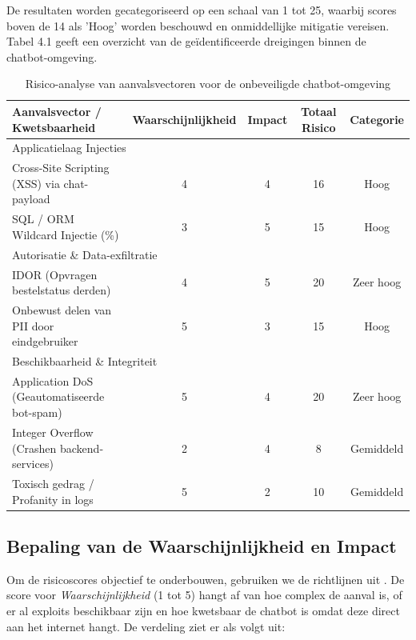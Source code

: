 De resultaten worden gecategoriseerd op een schaal van 1 tot 25, waarbij scores boven de 14 als 'Hoog' worden beschouwd en onmiddellijke mitigatie vereisen. Tabel 4.1 geeft een overzicht van de geïdentificeerde dreigingen binnen de chatbot-omgeving.

\begin{table}[H]
    \centering
    \caption{Risico-analyse van aanvalsvectoren voor de onbeveiligde chatbot-omgeving}
    \begin{tabular}{|p{6cm}|c|c|c|c|}
        \hline
        Aanvalsvector / Kwetsbaarheid & Waarschijnlijkheid & Impact & Totaal Risico & Categorie \\
        \hline
        \multicolumn{5}{|l|}{Applicatielaag Injecties} \\
        \hline
        Cross-Site Scripting (XSS) via chat-payload & 4 & 4 & 16 & Hoog \\
        SQL / ORM Wildcard Injectie (\%) & 3 & 5 & 15 & Hoog \\
        \hline
        \multicolumn{5}{|l|}{Autorisatie \& Data-exfiltratie} \\
        \hline
        IDOR (Opvragen bestelstatus derden) & 4 & 5 & 20 & Zeer hoog \\
        Onbewust delen van PII door eindgebruiker & 5 & 3 & 15 & Hoog \\
        \hline
        \multicolumn{5}{|l|}{Beschikbaarheid \& Integriteit} \\
        \hline
        Application DoS (Geautomatiseerde bot-spam) & 5 & 4 & 20 & Zeer hoog \\
        Integer Overflow (Crashen backend-services) & 2 & 4 & 8 & Gemiddeld \\
        Toxisch gedrag / Profanity in logs & 5 & 2 & 10 & Gemiddeld \\
        \hline
    \end{tabular}
\end{table}

\subsection{Bepaling van de Waarschijnlijkheid en Impact}%
\label{sub:bepaling_parameters}

Om de risicoscores objectief te onderbouwen, gebruiken we de richtlijnen uit \textcite{nist80030}. De score voor \textit{Waarschijnlijkheid} (1 tot 5) hangt af van hoe complex de aanval is, of er al exploits beschikbaar zijn en hoe kwetsbaar de chatbot is omdat deze direct aan het internet hangt. De verdeling ziet er als volgt uit:

